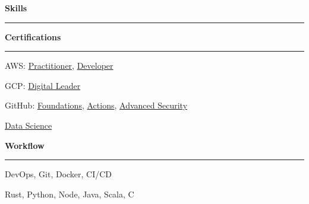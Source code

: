 \documentclass[11pt,letterpaper]{article}
\begin{document}
\begin{justify}
      {\Large \textbf{Skills}\strut}
      \hrule
      \begin{minipage}[t]{8.5cm}
            \textbf{Certifications}\strut
            \hrule
            \vspace{0.2cm}
            \begin{itemize}[label={}, leftmargin=0pt]
                  \begin{item}
                        AWS:
                        \href{https://www.credly.com/badges/33614ca6-2f0d-456b-87e9-bf8b8591cbf8/public_url}{Practitioner},
                        \href{https://www.credly.com/badges/e9b6c64c-2175-4345-950b-6331fd88af43/public_url}{Developer}
                  \end{item}
                  \begin{item}
                        GCP:
                        \href{https://www.credly.com/badges/0f158c45-adb0-4ac9-9d5f-0039649e4808/public_url}{Digital Leader}
                  \end{item}
                  \begin{item}
                        GitHub:
                        \href{https://www.credly.com/badges/0f59d53a-1ecb-4f6f-8a84-96fa3cb55965/public_url}{Foundations},
                        \href{https://www.credly.com/badges/6da40853-2bc6-4738-887e-8710a10e7a29/public_url}{Actions},
                        \href{https://www.credly.com/badges/b3c3ae21-61a9-4519-85d6-29a3bb8c443a/public_url}{Advanced Security}
                  \end{item}
                  \begin{item}
                        \href{https://bestr.it/verify/EJ2XAFDPBL}{Data Science}
                  \end{item}
            \end{itemize}
      \end{minipage}
      \hfill
      \begin{minipage}[t]{6.6cm}
            \textbf{Workflow}\strut
            \hrule
            \vspace{0.2cm}
            \begin{itemize}[label={}, leftmargin=0pt]
                  \begin{item}
                        DevOps, Git, Docker, CI/CD
                  \end{item}
                  \begin{item}
                        Rust, Python, Node, Java, Scala, C
                  \end{item}

\end{itemize}
\end{minipage}
\end{justify}
\end{document}
